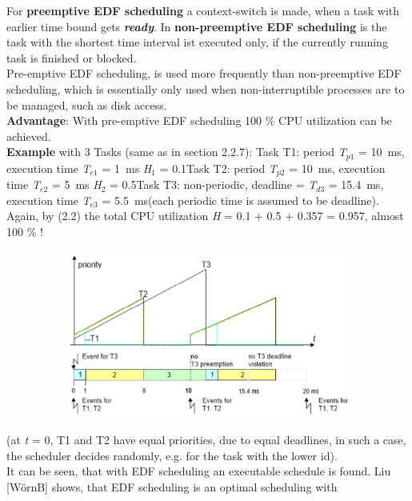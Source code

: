 For \textbf{preemptive EDF scheduling} a context-switch is made, when a task with earlier time bound gets \textbf{\textit{ready}}. In \textbf{non-preemptive EDF scheduling} is the task with the shortest time interval ist executed only, if the currently running task is finished or blocked.\\

Pre-emptive EDF scheduling, is used more frequently than non-preemptive EDF scheduling, which is essentially only used when non-interruptible processes are to be managed, such as disk access.\\

\textbf{Advantage}: With pre-emptive EDF scheduling 100 \% CPU utilization can be achieved. \\

\textbf{Example} with 3 Tasks (same as in section 2.2.7): Task T1: period \textit{T}${}_{p1}$ = 10~ms, execution time \textit{T}${}_{e1}$ = 1~ms  \textit{H}${}_{1}$ = 0.1Task T2: period \textit{T}${}_{p2}$ = 10~ms, execution time\textit{ T}${}_{e2}$ = 5~ms  \textit{H}${}_{2}$ = 0.5Task T3: non-periodic, deadline = \textit{T}${}_{d3}$ = 15.4~ms, execution time\textit{ T}${}_{e3}$ = 5.5~ms(each periodic time is assumed to be deadline). Again, by (2.2) the total CPU utilization \textit{H} = 0.1 + 0.5 + 0.357 = 0.957, almost 100 \% !\\

 	\begin{figure}[h]
    \centering
    \includegraphics[width=13cm, height=5.5cm]{Images/image101.png}
    \label{fig:Fig 47}
    \end{figure}


(at \textit{t} = 0, T1 and T2 have equal priorities, due to equal deadlines, in such a case, the scheduler decides randomly, e.g. for the task with the lower id).\\

It can be seen, that with EDF scheduling an executable schedule is found. Liu [W\"{o}rnB] shows, that EDF scheduling is an optimal scheduling with


